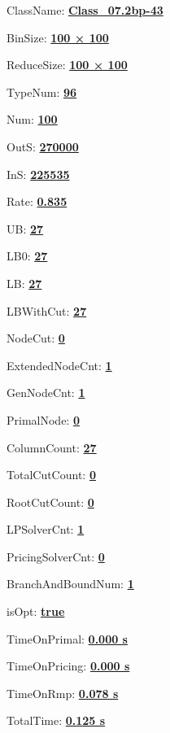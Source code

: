 \documentclass[11pt]{article}
\begin{document}
\pagestyle{empty}


ClassName: \underline{\textbf{Class_07.2bp-43}}
\par
BinSize: \underline{\textbf{100 × 100}}
\par
ReduceSize: \underline{\textbf{100 × 100}}
\par
TypeNum: \underline{\textbf{96}}
\par
Num: \underline{\textbf{100}}
\par
OutS: \underline{\textbf{270000}}
\par
InS: \underline{\textbf{225535}}
\par
Rate: \underline{\textbf{0.835}}
\par
UB: \underline{\textbf{27}}
\par
LB0: \underline{\textbf{27}}
\par
LB: \underline{\textbf{27}}
\par
LBWithCut: \underline{\textbf{27}}
\par
NodeCut: \underline{\textbf{0}}
\par
ExtendedNodeCnt: \underline{\textbf{1}}
\par
GenNodeCnt: \underline{\textbf{1}}
\par
PrimalNode: \underline{\textbf{0}}
\par
ColumnCount: \underline{\textbf{27}}
\par
TotalCutCount: \underline{\textbf{0}}
\par
RootCutCount: \underline{\textbf{0}}
\par
LPSolverCnt: \underline{\textbf{1}}
\par
PricingSolverCnt: \underline{\textbf{0}}
\par
BranchAndBoundNum: \underline{\textbf{1}}
\par
isOpt: \underline{\textbf{true}}
\par
TimeOnPrimal: \underline{\textbf{0.000 s}}
\par
TimeOnPricing: \underline{\textbf{0.000 s}}
\par
TimeOnRmp: \underline{\textbf{0.078 s}}
\par
TotalTime: \underline{\textbf{0.125 s}}
\par
\newpage


\end{document}
